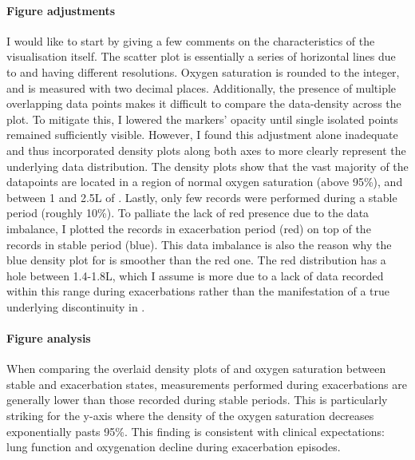 \paragraph{Figure adjustments}
I would like to start by giving a few comments on the characteristics of the visualisation itself. The scatter plot is essentially a series of horizontal lines due to \SP and \F having different resolutions. Oxygen saturation is rounded to the integer, and \F is measured with two decimal places. Additionally, the presence of multiple overlapping data points makes it difficult to compare the data-density across the plot. To mitigate this, I lowered the markers’ opacity until single isolated points remained sufficiently visible. However, I found this adjustment alone inadequate and thus incorporated density plots along both axes to more clearly represent the underlying data distribution. The density plots show that the vast majority of the datapoints are located in a region of normal oxygen saturation (above 95\%), and between 1 and 2.5L of \F. Lastly, only few records were performed during a stable period (roughly 10\%). To palliate the lack of red presence due to the data imbalance, I plotted the records in exacerbation period (red) on top of the records in stable period (blue). This data imbalance is also the reason why the blue density plot for \F is smoother than the red one. The red distribution has a hole between 1.4-1.8L, which I assume is more due to a lack of data recorded within this range during exacerbations rather than the manifestation of a true underlying discontinuity in \F.

\paragraph{Figure analysis}
When comparing the overlaid density plots of \F and oxygen saturation between stable and exacerbation states, measurements performed during exacerbations are generally lower than those recorded during stable periods. This is particularly striking for the y-axis where the density of the oxygen saturation decreases exponentially pasts 95\%. This finding is consistent with clinical expectations: lung function and oxygenation decline during exacerbation episodes.

